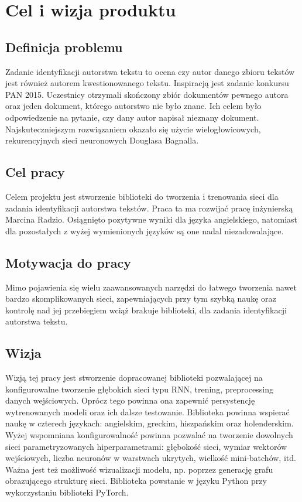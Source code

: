 \newpage
\section{Cel i wizja produktu}

\subsection{Definicja problemu}
Zadanie identyfikacji autorstwa tekstu to ocena czy autor danego zbioru tekstów jest również 
autorem kwestionowanego tekstu. Inspiracją jest zadanie konkursu PAN 2015. Uczestnicy otrzymali skończony zbiór dokumentów pewnego autora
oraz jeden dokument, którego autorstwo nie było znane. Ich celem było odpowiedzenie na pytanie, czy dany autor napisał nieznany dokument.
Najskuteczniejszym rozwiązaniem okazało się użycie wielogłowicowych, rekurencyjnych sieci neuronowych Douglasa Bagnalla.

 
\subsection{Cel pracy}
Celem projektu jest stworzenie biblioteki do tworzenia i trenowania sieci dla zadania 
identyfikacji autorstwa tekstów. Praca ta ma rozwijać pracę inżynierską Marcina Radzio. Osiągnięto pozytywne wyniki dla języka angielskiego, natomiast 
dla pozostałych z wyżej wymienionych języków są one nadal niezadowalające.


\subsection{Motywacja do pracy}
Mimo pojawienia się wielu zaawansowanych narzędzi do łatwego tworzenia nawet bardzo skomplikowanych sieci, 
zapewniających przy tym szybką naukę oraz kontrolę nad jej przebiegiem wciąż brakuje biblioteki, dla zadania identyfikacji autorstwa 
tekstu.

\subsection{Wizja}
Wizją tej pracy jest stworzenie dopracowanej biblioteki pozwalającej na konfigurowalne tworzenie 
głębokich sieci typu RNN, trening, preprocessing danych wejściowych. Oprócz tego powinna ona 
zapewnić persystencję wytrenowanych modeli oraz ich dalsze testowanie. Biblioteka powinna wspierać 
naukę w czterech językach: angielskim, greckim, hiszpańskim oraz holenderskim. Wyżej wspomniana konfigurowalność powinna 
pozwalać na tworzenie dowolnych sieci parametryzowanych hiperparametrami: głębokość sieci, wymiar 
wektorów wejściowych, liczba neuronów w warstwach ukrytych, wielkość mini-batchów, itd. Ważna jest 
też możliwość wizualizacji modelu, np. poprzez generację grafu obrazującego strukturę sieci. 
Biblioteka powstanie w języku Python przy wykorzystaniu biblioteki PyTorch.

